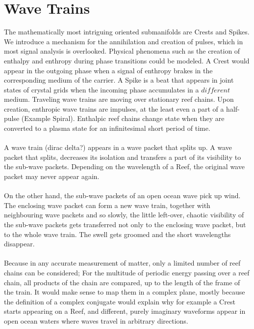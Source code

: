 \documentclass{report}
\begin{document}
\section{Wave Trains}
The mathematically most intriguing oriented submanifolds are Crests and Spikes. We introduce a mechanism for the annihilation and creation of pulses, which in most signal analysis is overlooked. Physical phenomena such as the creation of enthalpy and enthropy during phase transitions could be modeled. A Crest would appear in the outgoing phase when a signal of enthropy brakes in the corresponding medium of the carrier. A Spike is a beat that appears in joint states of crystal grids when the incoming phase accumulates in a $different$ medium.
Traveling wave trains are moving over stationary reef chains. Upon creation, enthropic wave trains are impulses, at the least even a part of a half-pulse (Example Spiral). Enthalpic reef chains change state when they are converted to a plasma state for an infinitesimal short period of time.\\\\
A wave train (dirac delta?) appears in a wave packet that splits up. A wave packet that splits, decreases its isolation and transfers a part of its visibility to the sub-wave packets. Depending on the wavelength of a Reef, the original wave packet may never appear again.\\\\
On the other hand, the sub-wave packets of an open ocean wave pick up wind. The enclosing wave packet can form a new wave train, together with neighbouring wave packets and so slowly, the little left-over, chaotic visibility of the sub-wave packets gets transferred not only to the enclosing wave packet, but to the whole wave train. The swell gets groomed and the short wavelengths disappear.\\\\
Because in any accurate measurement of matter, only a limited number of reef chains can be considered; For the multitude of periodic energy passing over a reef chain, all products of the chain are compared, up to the length of the frame of the train.
It would make sense to map them in a complex plane, mostly because the definition of a complex conjugate would explain why for example a Crest starts appearing on a Reef, and different, purely imaginary waveforms appear in open ocean waters where waves travel in arbitrary directions.
\end{document}
